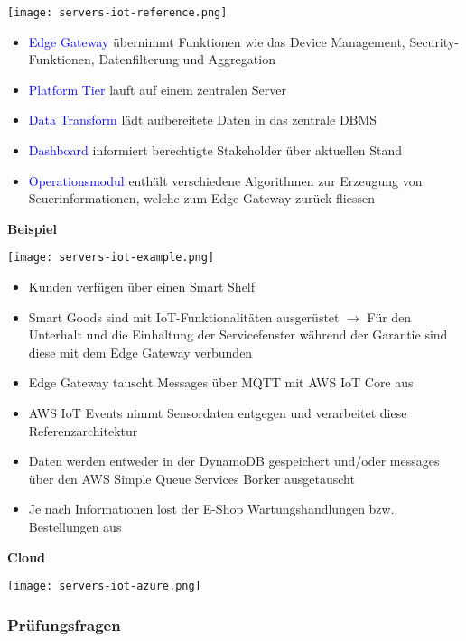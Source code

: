 \texttt{[image: servers-iot-reference.png]}

\begin{itemize}
    \item \textcolor{blue}{Edge Gateway} übernimmt Funktionen wie das Device Management, Security-Funktionen, Datenfilterung und Aggregation
    \item \textcolor{blue}{Platform Tier} lauft auf einem zentralen Server
    \item \textcolor{blue}{Data Transform} lädt aufbereitete Daten in das zentrale DBMS
    \item \textcolor{blue}{Dashboard} informiert berechtigte Stakeholder über aktuellen Stand
    \item \textcolor{blue}{Operationsmodul} enthält verschiedene Algorithmen zur Erzeugung von Seuerinformationen, welche zum Edge Gateway zurück fliessen
\end{itemize}
\vspace{10pt}
\textbf{Beispiel}

\texttt{[image: servers-iot-example.png]}

\begin{itemize}
    \item Kunden verfügen über einen Smart Shelf
    \item Smart Goods sind mit IoT-Funktionalitäten ausgerüstet $\rightarrow$ Für den Unterhalt und die Einhaltung der Servicefenster während der Garantie sind diese mit dem Edge Gateway verbunden
    \item Edge Gateway tauscht Messages über MQTT mit AWS IoT Core aus
    \item AWS IoT Events nimmt Sensordaten entgegen und verarbeitet diese Referenzarchitektur
    \item Daten werden entweder in der DynamoDB gespeichert und/oder messages über den AWS
    Simple Queue Services Borker ausgetauscht
    \item Je nach Informationen löst der E-Shop Wartungshandlungen bzw. Bestellungen aus
\end{itemize}

\textbf{Cloud}

\texttt{[image: servers-iot-azure.png]}

\subsubsection{Prüfungsfragen}

